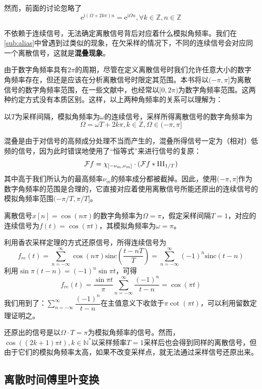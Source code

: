 然而，前面的讨论忽略了
$$\mathrm{e}^{\mathrm{i}(\Omega+2k\pi)n}=\mathrm{e}^{\mathrm{i}\Omega n},\forall k\in\mathbb{Z},n\in\mathbb{Z}$$

不依赖于连续信号，无法确定离散信号背后对应着什么模拟角频率。我们在\ref{sub:alias}中曾遇到过类似的现象，在欠采样的情况下，不同的连续信号会对应同一个离散信号，这就是\textbf{混叠现象}。

由于数字角频率具有$2\pi$的周期，尽管在定义离散信号时我们允许任意大小的数字角频率存在，但还是应该在分析离散信号时限定其范围。本书将以$(-\pi,\pi]$为离散信号的数字角频率范围\cite{signal_systems}，在一些文献中，也经常以$[0,2\pi)$为数字角频率范围。这两种约定方式没有本质区别。这样，以上两种角频率的关系可以理解为：

\begin{proposition}
以$T$为采样间隔，模拟角频率为$\omega$的连续信号，采样所得离散信号的数字角频率为
\[\Omega=\omega T+2k\pi,k\in\mathbb{Z},\Omega\in(-\pi,\pi]\]
\end{proposition}

混叠是由于对信号的高频成分处理不当而产生的，混叠所得信号一定为（相对）低频的信号，因为此时错误地使用了“恒等式”来进行信号的复原：
\[\mathcal{F} f=\chi_{[-\nu_m,\nu_m]}\cdot (\mathcal{F} f*\operatorname{III}_{1/T})\]
其中高于我们所认为的最高频率$\nu_m$的频率成分都被截掉。因此，使用$(-\pi,\pi]$作为数字角频率的范围是合理的，它直接对应着使用离散信号所能还原出的连续信号的模拟角频率范围$(-\pi/T,\pi/T]$。

\begin{example}
    离散信号$x[n]=\cos(n\pi)$的数字角频率为$\Omega=\pi$，假定采样间隔$T=1$，对应的连续信号为$f(t)=\cos(\pi t)$，其模拟角频率为$\omega=\pi$。

    利用香农采样定理的方式还原信号，所得连续信号为
    \[f_{re}(t)=\sum_{n=-\infty}^{\infty}\cos(n\pi)\text{sinc}\left(\frac{t-nT}{T}\right)=\sum_{n=-\infty}^{\infty}(-1)^n\text{sinc}\left(t-n\right)\]
    利用$\sin\pi(t-n)=(-1)^n\sin\pi t$，可得
    \[f_{re}(t)=\frac{\sin\pi t}{\pi}\sum_{n=-\infty}^{\infty}\frac{(-1)^n}{t-n}=\cos(\pi t)\]
    我们用到了：$\sum_{n=-\infty}^{\infty}\dfrac{(-1)^n}{t-n}$在主值意义下收敛于$\pi\cot(\pi t)$，可以利用留数定理证明之。

    还原出的信号是以$\Omega\cdot T=\pi$为模拟角频率的信号。然而，$\cos((2k+1)\pi t),k\in\mathbb{N}^*$以采样频率$T=1$采样后也会得到同样的离散信号，但由于它们的模拟角频率太高，如果不改变采样点，就无法通过采样信号还原出来。
\end{example}

\subsection{离散时间傅里叶变换}\label{sub:dtft}

